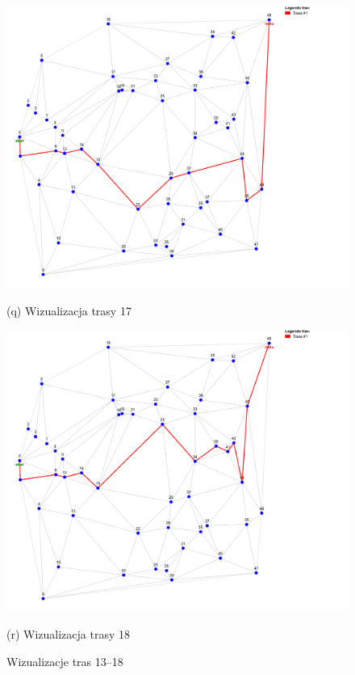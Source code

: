 \documentclass{article}
\begin{document}
\begin{figure}[H]
    \begin{minipage}[b]{0.48\linewidth}
        \includegraphics[width=\linewidth]{17.png}
        \caption*{(q) Wizualizacja trasy 17}
    \end{minipage}
    \hfill
    \begin{minipage}[b]{0.48\linewidth}
        \includegraphics[width=\linewidth]{18.png}
        \caption*{(r) Wizualizacja trasy 18}
    \end{minipage}

    \caption{Wizualizacje tras 13–18}
    \label{fig:routes-13-18}
\end{figure}
\end{document}
